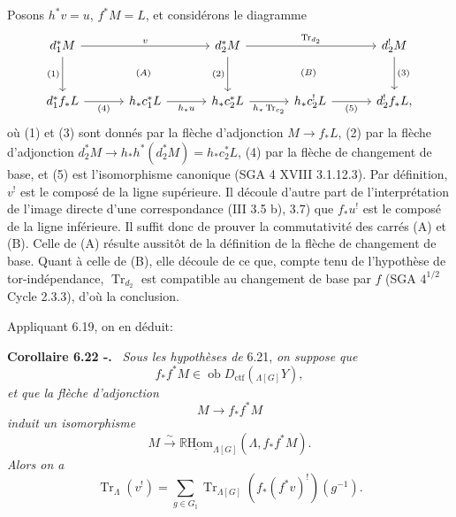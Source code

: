 \documentclass[11pt]{article}
\newenvironment{statement}[1]{\par\medskip\noindent\textbf{#1.}\ }{\par\medskip}
\newcommand{\R}{\mathbb{R}}\newcommand{\RHomCore}{\mathbb{R}\mathrm{Hom}}
\providecommand{\RHom}{\RHomCore}
\providecommand{\uRHom}{\underline{\RHom}}
\providecommand{\Tr}{\operatorname{Tr}}
\providecommand{\Tr}{\operatorname{Tr}}
\providecommand{\Ob}{\operatorname{ob}}
\providecommand{\Tr}{\operatorname{Tr}}
\providecommand{\RHom}{\RHomCore}
\providecommand{\RHom}{\R\mathcal{H}om}
\providecommand{\Ob}{\operatorname{ob}}
\providecommand{\R}{\mathrm R}
\providecommand{\Tr}{\operatorname{Tr}}
\providecommand{\Ob}{\operatorname{Ob}}
\providecommand{\RHom}{\RHomCore}
\providecommand{\Tr}{\operatorname{Tr}}
\providecommand{\Ob}{\operatorname{ob}}
\providecommand{\Ob}{\operatorname{Ob}}
\begin{document}
Posons $h^*v=u$, $f^*M=L$, et considérons le diagramme
\[
\begin{tikzcd}[column sep=3.2em,row sep=large]
d_1^*M \arrow[rr,"v"] \arrow[d,"{(1)}"'] &&
d_2^*M \arrow[rr,"\Tr_{d_2}"] \arrow[d,"{(2)}"'] &&
d_2^!M \arrow[d,"{(3)}"]\\
d_1^*f_*L \arrow[r,"{(4)}"'] &
h_*c_1^*L \arrow[r,"h_*u"'] &
h_*c_2^*L \arrow[r,"h_*\Tr_{c_2}"'] &
h_*c_2^!L \arrow[r,"{(5)}"'] &
d_2^!f_*L,
\arrow[from=1-1,to=2-3, phantom, "\scriptstyle (A)"]
\arrow[from=1-3,to=2-5, phantom, "\scriptstyle (B)"]
\end{tikzcd}
\]
où (1) et (3) sont donnés par la flèche d'adjonction $M\to f_*L$, (2) par la flèche d'adjonction $d_2^*M\to h_*h^*(d_2^*M)=h_*c_2^*L$, (4) par la flèche de changement de base, et (5) est l'isomorphisme canonique (SGA 4 XVIII 3.1.12.3). Par définition, $v^!$ est le composé de la ligne supérieure. Il découle d'autre part de l'interprétation de l'image directe d'une correspondance (III 3.5 b), 3.7) que $f_*u^!$ est le composé de la ligne inférieure. Il suffit donc de prouver la commutativité des carrés (A) et (B). Celle de (A) résulte aussitôt de la définition de la flèche de changement de base. Quant à celle de (B), elle découle de ce que, compte tenu de l'hypothèse de tor-indépendance, $\Tr_{d_2}$ est compatible au changement de base par $f$ (SGA $4^{1/2}$ Cycle 2.3.3), d'où la conclusion.

Appliquant 6.19, on en déduit:

\begin{statement}{Corollaire 6.22 -}
\emph{Sous les hypothèses de} 6.21, \emph{on suppose que}
\[
f_*f^*M\in\Ob D_{\mathrm{ctf}}({}_{\Lambda[G]}Y),
\]
\emph{et que la flèche d'adjonction}
\[
M\to f_*f^*M
\]
\emph{induit un isomorphisme}
\[
M\xrightarrow{\sim}\uRHom_{\Lambda[G]}(\Lambda,f_*f^*M).
\]
\emph{Alors on a}
\begin{equation}
\Tr_{\Lambda}(v^!)=
\sum_{g\in G_{\natural}}\Tr_{\Lambda[G]}(f_*(f^*v)^!)(g^{-1}).
\tag{6.22.1}
\end{equation}
\end{statement}
\end{document}
